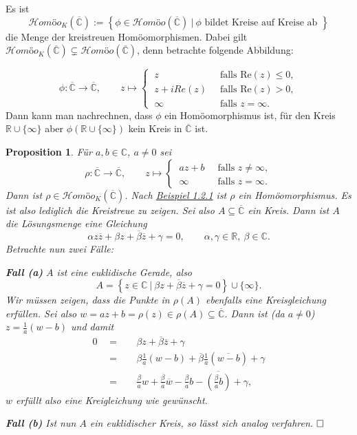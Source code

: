 \documentclass[11pt]{book}
\numberwithin{dummy}{section}
\newtheorem{proposition}[theorem]{Proposition}
\theoremstyle{nonumberbreak}
\newenvironment{pr}[1][]{\ifthenelse{\equal{#1}{}}{\proof}{\proof[#1]}\rm}{\endproof}
\newenvironment{definbem}[1][]{\ifthenelse{\equal{#1}{}}{\definibem}{\definibem[#1]}\rm}{\enddefinibem}
\newcommand{\C}{\mathbb{C}}
\newcommand{\CC}{\overline{\mathbb{C}}}
\newcommand{\la}{\longrightarrow}
\newcommand{\homoecc}{\mathcal{H}\textit{omöo}(\CC)}
\newcommand{\homoekcc}{\mathcal{H}\textit{omöo}_K(\CC)}
\begin{document}
\begin{spacing}{1.4}
\begin{definbem}
Es ist 
$$\homoekcc := \left\{ \phi \in \homoecc \ \vert \ \phi \textrm{ bildet Kreise auf Kreise ab } \right\}$$
die Menge der kreistreuen Homöomorphismen. Dabei gilt $\homoekcc \subsetneq \homoecc$, denn betrachte folgende Abbildung:

$$\phi: \CC \la \CC, \qquad z \mapsto \begin{cases} \ z& \ \textrm{ falls } \mathrm{Re}(z) \leqslant 0, \\ \ z + i Re(z) & \ \textrm{ falls } \mathrm{Re}(z) >0, \\ \ \infty & \ \textrm{ falls } z = \infty. \end{cases}$$
Dann kann man nachrechnen, dass $\phi$ ein Homöomorphismus ist, für den Kreis $\mathbb{R} \cup \{\infty\}$ aber $\phi(\mathbb{R} \cup \{\infty\})$ kein Kreis in $\CC$ ist.
\end{definbem}


\hypertarget{propeinszweidrei}{}
\begin{proposition}
Für $a,b \in \C$, $a \neq 0$ sei 
$$\rho: \CC \la \CC, \qquad z \mapsto \begin{cases} \ az + b & \ \textrm{ falls } z \neq \infty, \\ \ \infty & \ \textrm{ falls } z = \infty. \end{cases}$$
Dann ist $\rho \in \homoekcc$.
\begin{pr}
Nach \hyperlink{beispieleinszweieins}{Beispiel 1.2.1} ist $\rho$ ein Homöomorphismus. Es ist also lediglich die Kreistreue zu zeigen. Sei also $A \subseteq \CC$ ein Kreis. Dann ist $A$ die Lösungsmenge eine Gleichung
$$\alpha z \overline{z} + \beta z + \overline{\beta} \overline{z} + \gamma = 0, \qquad \alpha, \gamma \in \mathbb{R}, \ \beta \in \C.$$
Betrachte nun zwei Fälle:
\begin{compactenum}
\item[\textbf{Fall (a)}] $A$ ist eine euklidische Gerade, also 
$$A= \left\{ z \in \C \ \vert \ \beta z + \overline{\beta} \overline{z} + \gamma = 0 \right\} \cup \{\infty\}.$$
Wir müssen zeigen, dass die Punkte in $\rho(A)$ ebenfalls eine Kreisgleichung erfüllen. Sei also $w= az+b = \rho(z) \in \rho(A) \subseteq \CC$. Dann ist (da $a \neq 0$) $z= \frac{1}{a} (w-b)$ und damit
\setlength{\abovedisplayskip}{5.5pt}
\setlength{\belowdisplayskip}{5.5pt}
\begin{alignat*}{5}
0 \ \ &=&& \ \ \beta z + \overline{\beta} \overline{z} + \gamma \\
&=&& \ \ \beta \frac{1}{a}(w-b) + \overline{\beta} \frac{1}{a} (\overline{w-b}) + \gamma \\
&=&& \ \ \frac{\beta}{a} w + \frac{\overline{\beta}}{\overline{a}} \overline{w} - \frac{\beta}{a} b - \overline{\left(\frac{\beta}{a} b \right)} + \gamma,
\end{alignat*}
$w$ erfüllt also eine Kreigleichung wie gewünscht.
\item[\textbf{Fall (b)}] Ist nun $A$ ein euklidischer Kreis, so lässt sich analog verfahren. $\hfill \Box$
\end{compactenum}
\end{pr}




\end{proposition}
\end{spacing}
\end{document}
